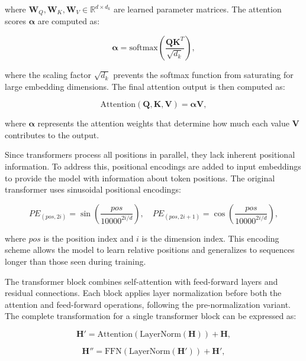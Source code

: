 where $\mathbf{W}_Q, \mathbf{W}_K, \mathbf{W}_V \in \mathbb{R}^{d \times d_k}$ are learned parameter matrices. The attention scores $\boldsymbol{\alpha}$ are computed as:

\begin{equation}
\boldsymbol{\alpha} = \text{softmax}\left(\frac{\mathbf{Q}\mathbf{K}^T}{\sqrt{d_k}}\right),
\end{equation}

where the scaling factor $\sqrt{d_k}$ prevents the softmax function from saturating for large embedding dimensions. The final attention output is then computed as:

\begin{equation}
\text{Attention}(\mathbf{Q}, \mathbf{K}, \mathbf{V}) = \boldsymbol{\alpha}\mathbf{V},
\end{equation}

where $\boldsymbol{\alpha}$ represents the attention weights that determine how much each value $\mathbf{V}$ contributes to the output.

Since transformers process all positions in parallel, they lack inherent positional information. To address this, positional encodings are added to input embeddings to provide the model with information about token positions. The original transformer uses sinusoidal positional encodings:

\begin{equation}
PE_{(pos, 2i)} = \sin\left(\frac{pos}{10000^{2i/d}}\right), \quad PE_{(pos, 2i+1)} = \cos\left(\frac{pos}{10000^{2i/d}}\right),
\end{equation}

where $pos$ is the position index and $i$ is the dimension index. This encoding scheme allows the model to learn relative positions and generalizes to sequences longer than those seen during training.

The transformer block combines self-attention with feed-forward layers and residual connections. Each block applies layer normalization before both the attention and feed-forward operations, following the pre-normalization variant. The complete transformation for a single transformer block can be expressed as:

\begin{equation}
\mathbf{H}' = \text{Attention}(\text{LayerNorm}(\mathbf{H})) + \mathbf{H},
\end{equation}

\begin{equation}
\mathbf{H}'' = \text{FFN}(\text{LayerNorm}(\mathbf{H}')) + \mathbf{H}',
\end{equation}


